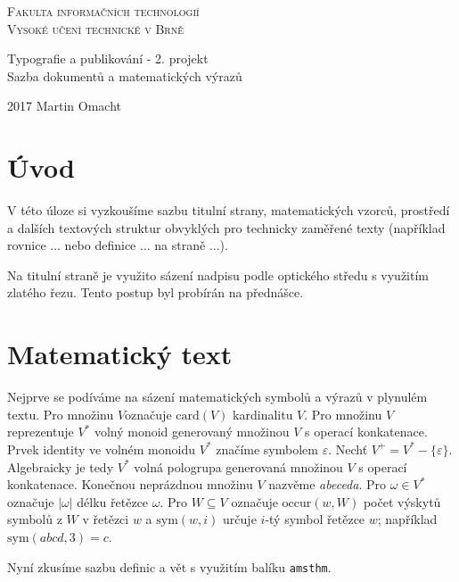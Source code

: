 \documentclass[11pt, a4paper, twocolumn]{article}
\theoremstyle{definition}
\begin{document}
	\begin{titlepage}
		\begin{center}
			{\linespread{0.75}
				\Huge
				\textsc{Fakulta informačních technologií\\ Vysoké učení technické v Brně}
			}

			{\linespread{0.8}
				\LARGE
				Typografie a publikování - 2. projekt\\
				Sazba dokumentů a matematických výrazů
			}
		\end{center}		
		{\Large 2017 \hfill Martin Omacht}
	\end{titlepage}

	\section*{Úvod} %
	\label{sec:úvod}
	V této úloze si vyzkoušíme sazbu titulní strany, matematických vzorců, prostředí a dalších textových struktur obvyklých pro technicky zaměřené texty (například rovnice ... nebo definice ... na straně ...).

	Na titulní straně je využito sázení nadpisu podle optického středu s využitím zlatého řezu. Tento postup byl probírán na přednášce.

	\section{Matematický text} %
	\label{sec:matematický_text}
	Nejprve se podíváme na sázení matematických symbolů a výrazů v plynulém textu. Pro množinu $V$označuje $\mathrm{card}(V)$ kardinalitu $V$.
	Pro množinu $V$ reprezentuje $V^\ast$ volný monoid generovaný množinou $V$ s operací konkatenace.
	Prvek identity ve volném monoidu $V^*$ značíme symbolem $\varepsilon$.
	Nechť $V^+ = V^\ast - \{\varepsilon\}$. Algebraicky je tedy $V^\ast$ volná pologrupa generovaná množinou $V$ s operací konkatenace.
	Konečnou neprázdnou množinu $V$ nazvěme \emph{abeceda}.
	Pro $\omega \in V^\ast$ označuje $|\omega|$ délku řetězce $\omega$. Pro $W \subseteq V$ označuje $\mathrm{occur}(w,W)$ počet výskytů symbolů z $W$ v řetězci $w$ a $\mathrm{sym}(w,i)$ určuje $i$-tý symbol řetězce $w$; například $\mathrm{sym}(abcd,3)=c$.

	Nyní zkusíme sazbu definic a vět s využitím balíku \texttt{amsthm}.
\end{document}
